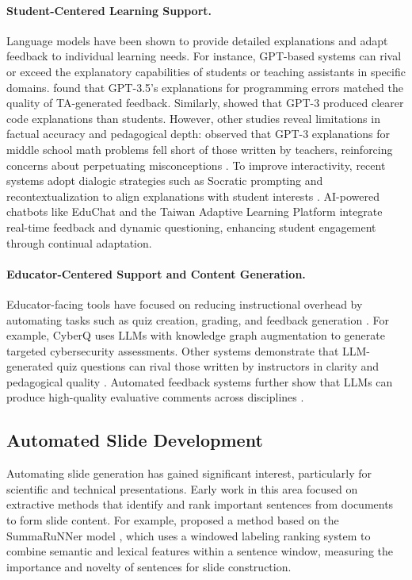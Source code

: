 \documentclass[letterpaper]{article} %
\begin{document}
\paragraph{Student-Centered Learning Support.}
Language models have been shown to provide detailed explanations and adapt feedback to individual learning needs. For instance, GPT-based systems can rival or exceed the explanatory capabilities of students or teaching assistants in specific domains. \citet{balse2023evaluating} found that GPT-3.5's explanations for programming errors matched the quality of TA-generated feedback. Similarly, \citet{leinonen2023comparing} showed that GPT-3 produced clearer code explanations than students. However, other studies reveal limitations in factual accuracy and pedagogical depth: \citet{prihar2023comparing} observed that GPT-3 explanations for middle school math problems fell short of those written by teachers, reinforcing concerns about perpetuating misconceptions  \citep{kunz2024properties}. To improve interactivity, recent systems adopt dialogic strategies such as Socratic prompting and recontextualization to align explanations with student interests \citep{shridhar2022automatic, yadav2023contextualizing}. AI-powered chatbots like EduChat \citep{dan2023educhat} and the Taiwan Adaptive Learning Platform \citep{kuo2023leveraging} integrate real-time feedback and dynamic questioning, enhancing student engagement through continual adaptation.



\paragraph{Educator-Centered Support and Content Generation.}
Educator-facing tools have focused on reducing instructional overhead by automating tasks such as quiz creation, grading, and feedback generation \citep{alsafari2024effective, kasneci2023chatgpt}. For example, CyberQ \citep{agrawal2024cyberq} uses LLMs with knowledge graph augmentation to generate targeted cybersecurity assessments. Other systems demonstrate that LLM-generated quiz questions can rival those written by instructors in clarity and pedagogical quality \citep{elkins2024how, doughty2024comparative, xiao2023evaluating}. Automated feedback systems further show that LLMs can produce high-quality evaluative comments across disciplines \citep{xiao2024automation, li2024automated}.


\subsection{Automated Slide Development}
Automating slide generation has gained significant interest, particularly for scientific and technical presentations. Early work in this area focused on extractive methods that identify and rank important sentences from documents to form slide content. For example, \citet{sefid2019automatic} proposed a method based on the SummaRuNNer model \citep{nallapati2017summarunner}, which uses a windowed labeling ranking system to combine semantic and lexical features within a sentence window, measuring the importance and novelty of sentences for slide construction.
\end{document}
